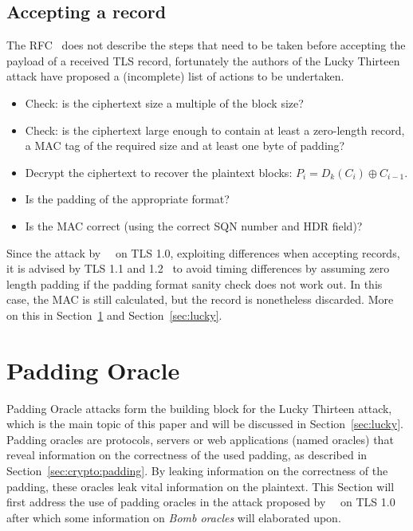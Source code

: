 \documentclass[10pt,conference,a4paper]{IEEEtran}
\begin{document}
\subsection{Accepting a record}
\label{sec:tls:accepting}
The RFC~\cite{ietf2008transport} does not describe the steps that need to be taken before accepting the payload of a received TLS record, fortunately the authors of the Lucky Thirteen attack have proposed a (incomplete) list of actions to be undertaken.
\begin{itemize}
  \item Check: is the ciphertext size a multiple of the block size?
  \item Check: is the ciphertext large enough to contain at least a zero-length record, a MAC tag of the required size and at least one byte of padding?
  \item Decrypt the ciphertext to recover the plaintext blocks: $P_i = D_k(C_i) \oplus C_{i-1}$.
  \item Is the padding of the appropriate format?
  \item Is the MAC correct (using the correct SQN number and HDR field)?
\end{itemize}
Since the attack by~\citeauthor{vaudenay2002security}~\cite{vaudenay2002security} on TLS 1.0, exploiting differences when accepting records, it is advised by TLS 1.1 and 1.2~\cite{ietf2008transport} to avoid timing differences by assuming zero length padding if the padding format sanity check does not work out. In this case, the MAC is still calculated, but the record is nonetheless discarded. More on this in Section~\ref{sec:paddingoracle} and Section~\ref{sec:lucky}.



\section{Padding Oracle}
\label{sec:paddingoracle}
Padding Oracle attacks form the building block for the Lucky Thirteen attack, which is the main topic of this paper and will be discussed in Section~\ref{sec:lucky}. Padding oracles are protocols, servers or web applications (named oracles) that reveal information on the correctness of the used padding, as described in Section~\ref{sec:crypto:padding}. By leaking information on the correctness of the padding, these oracles leak vital information on the plaintext. This Section will first address the use of padding oracles in the attack proposed by~\citeauthor{vaudenay2002security}~\cite{vaudenay2002security} on TLS 1.0~\cite{dierks1999rfc} after which some information on \textit{Bomb oracles} will elaborated upon.
\end{document}
